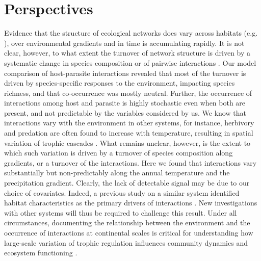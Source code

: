 \documentclass[12pt]{article}
\begin{document}
\section*{Perspectives}

Evidence that the structure of ecological networks does vary across habitats
(e.g. \citealt{Tylianakis2007}), over environmental gradients
\citealt{Lurgi2012} and in time \citep{Trojelsgaard2015} is accumulating
rapidly. It is not clear, however, to what extent the turnover of network
structure is driven by a systematic change in species composition or of
pairwise interactions \citep{Poisot2012, Poisot2015a}. Our model comparison of
host-parasite interactions revealed that most of the turnover is driven by
species-specific responses to the environment, impacting species richness, and
that co-occurrence was mostly neutral. Further, the occurrence of interactions
among host and parasite is highly stochastic even when both are present, and
not predictable by the variables considered by us. We know that interactions
vary with the environment in other systems, for instance, herbivory
\citep{Shurin2012} and predation \citep{Mckinnon2010,Legagneux2014} are often
found to increase with temperature, resulting in spatial variation of trophic
cascades \citep{Gray2016}. What remains unclear, however, is the extent to
which such variation is driven by a turnover of species composition along
gradients, or a turnover of the interactions. Here we found that interactions
vary substantially but non-predictably along the annual temperature and the
precipitation gradient. Clearly, the lack of detectable signal may be due to
our choice of covariates. Indeed, a previous study on a similar system
identified habitat characteristics as the primary drivers of interactions
\citep{Nyman2015}. New investigations with other systems will thus be required
to challenge this result. Under all circumstances, documenting the
relationship between the environment and the occurrence of interactions at
continental scales is critical for understanding how large-scale variation of
trophic regulation influences community dynamics and ecosystem functioning
\citep{Harfoot2014}.
\end{document}

